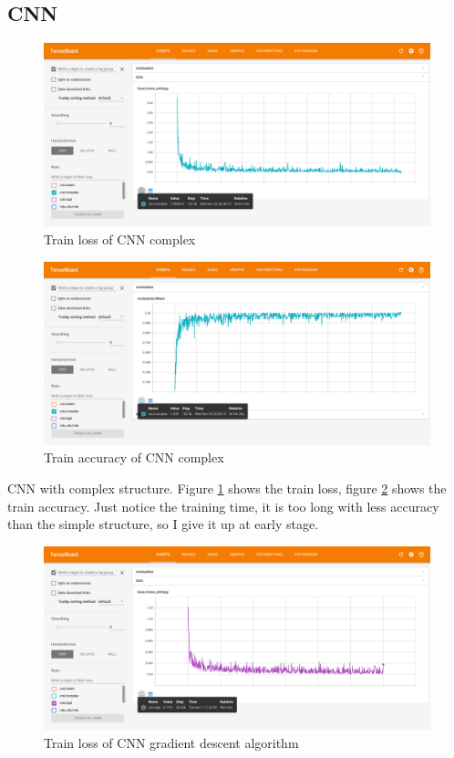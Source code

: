 \documentclass[10pt,twocolumn,letterpaper]{article}
\begin{document}
\begin{CJK}{UTF8}{gbsn}
\subsection{CNN}

\begin{figure}
\begin{center}
   \includegraphics[width=0.9\linewidth]{cnn_complex2.png}
\end{center}
\caption{Train loss of CNN complex}
\label{fig:cnn_complex2}
\end{figure}

\begin{figure}
\begin{center}
   \includegraphics[width=0.9\linewidth]{cnn_complex1.png}
\end{center}
\caption{Train accuracy of CNN complex}
\label{fig:cnn_complex1}
\end{figure}

CNN with complex structure. Figure \ref{fig:cnn_complex2} shows the train loss, figure \ref{fig:cnn_complex1} shows the train accuracy. Just notice the training time, it is too long with less accuracy than the simple structure, so I give it up at early stage.

\begin{figure}
\begin{center}
   \includegraphics[width=0.9\linewidth]{cnn_sgd2.png}
\end{center}
\caption{Train loss of CNN gradient descent algorithm}
\label{fig:cnn_sgd2}
\end{figure}


\end{CJK}
\end{document}
